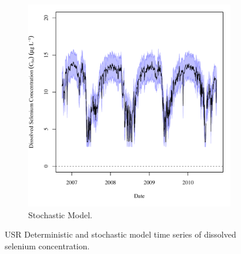 \begin{linenumbers}
\begin{landscape}
\begin{figure}
\begin{subfigure}{0.7\textwidth}
			\includegraphics[width=\tableCustomSize]{"Figures/Results_USR/Stochastic/c TS U201"}
			\caption{Stochastic Model.}
		\end{subfigure}
		\caption{USR Deterministic and stochastic model time series of dissolved selenium concentration.}
	\end{figure}
\end{landscape}


\end{linenumbers}
